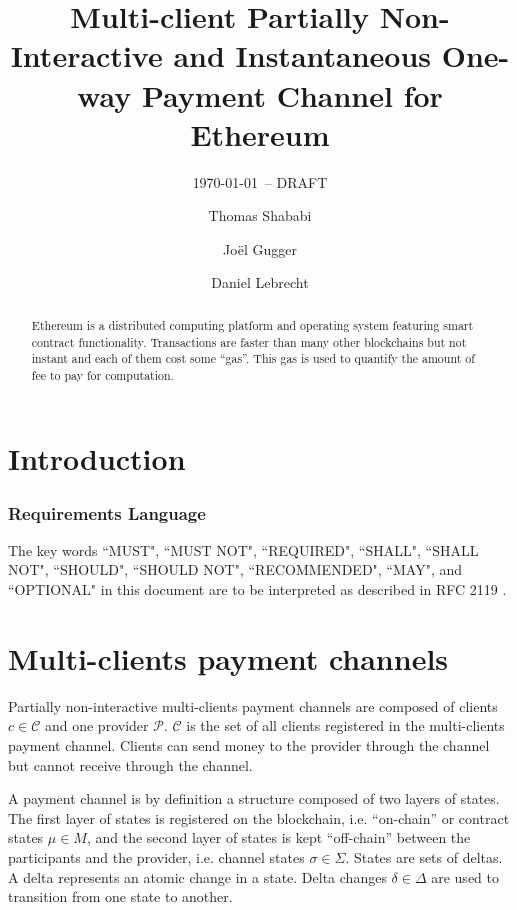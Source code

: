 \documentclass{llncs}
\begin{document}
\title{Multi-client Partially Non-Interactive and Instantaneous One-way Payment Channel for Ethereum}
\author{Thomas Shababi \and Jo\"el Gugger \and Daniel Lebrecht}

\subtitle{{\normalsize\today{\small\ -- DRAFT}}}

\maketitle

\begin{abstract} Ethereum is a distributed computing platform and operating system featuring smart contract functionality. Transactions are faster than many other blockchains but not instant and each of them cost some ``gas''. This gas is used to quantify the amount of fee to pay for computation. 
\end{abstract}

\section{Introduction}

\subsubsection{Requirements Language}
The key words ``MUST", ``MUST NOT", ``REQUIRED", ``SHALL", ``SHALL NOT",
``SHOULD", ``SHOULD NOT", ``RECOMMENDED", ``MAY", and ``OPTIONAL" in this
document are to be interpreted as described in RFC 2119 \cite{Bradner1997}.

\section{Multi-clients payment channels} Partially non-interactive multi-clients payment channels are composed of clients $c \in \mathcal{C}$ and one provider $\mathcal{P}$. $\mathcal{C}$ is the set of all clients registered in the multi-clients payment channel. Clients can send money to the provider through the channel but cannot receive through the channel.

A payment channel is by definition a structure composed of two layers of states. The first layer of states is registered on the blockchain, i.e. ``on-chain'' or contract states $\mu \in M$, and the second layer of states is kept ``off-chain'' between the participants and the provider, i.e. channel states $\sigma \in \Sigma$. States are sets of deltas. A delta represents an atomic change in a state. Delta changes $\delta \in \Delta$ are used to transition from one state to another.
\end{document}

